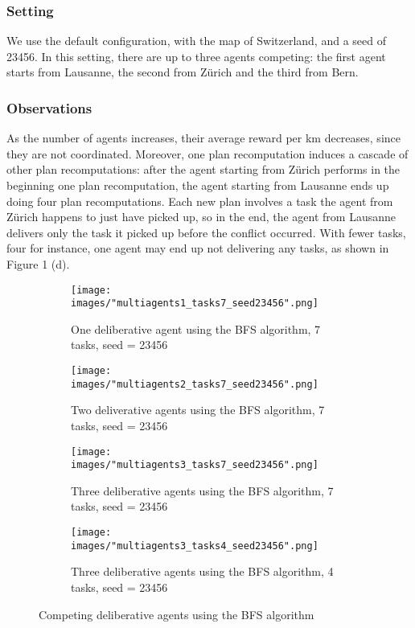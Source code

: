 \documentclass[10pt]{article}
\begin{document}
\subsubsection{Setting}
We use the default configuration, with the map of Switzerland, and a seed of 23456. In this setting, there are up to three agents competing: the first agent starts from Lausanne, the second from Z\"urich and the third from Bern.

\subsubsection{Observations}
As the number of agents increases, their average reward per km decreases, since they are not coordinated.
Moreover, one plan recomputation induces a cascade of other plan recomputations: after the agent starting from Z\"urich performs in the beginning one plan recomputation, the agent starting from Lausanne ends up doing four plan recomputations. Each new plan involves a task the agent from Z\"urich happens to just have picked up, so in the end, the agent from Lausanne delivers only the task it picked up before the conflict occurred.
With fewer tasks, four for instance, one agent may end up not delivering any tasks, as shown in Figure 1 (d).


\begin{figure}[h!]
\centering
\begin{subfigure}[t]{0.24\textwidth}
\captionsetup{width=1.0\textwidth}
\texttt{[image: images/"multiagents1\_tasks7\_seed23456".png]}
\caption{One deliberative agent using the BFS algorithm, 7 tasks, seed = 23456}
\end{subfigure}
\hfill
\begin{subfigure}[t]{0.24\textwidth}
\captionsetup{width=1.0\textwidth}
\texttt{[image: images/"multiagents2\_tasks7\_seed23456".png]}
\caption{Two deliverative agents using the BFS algorithm, 7 tasks, seed = 23456}
\end{subfigure}
\hfill
\begin{subfigure}[t]{0.24\textwidth}
\captionsetup{width=1.0\textwidth}
\texttt{[image: images/"multiagents3\_tasks7\_seed23456".png]}
\caption{Three deliberative agents using the BFS algorithm, 7 tasks, seed = 23456}
\end{subfigure}
\hfill
\begin{subfigure}[t]{0.24\textwidth}
\captionsetup{width=1.0\textwidth}
\texttt{[image: images/"multiagents3\_tasks4\_seed23456".png]}
\caption{Three deliberative agents using the BFS algorithm, 4 tasks, seed = 23456}
\end{subfigure}
\caption{Competing deliberative agents using the BFS algorithm}
\label{discount factor}
\end{figure}
\end{document}
